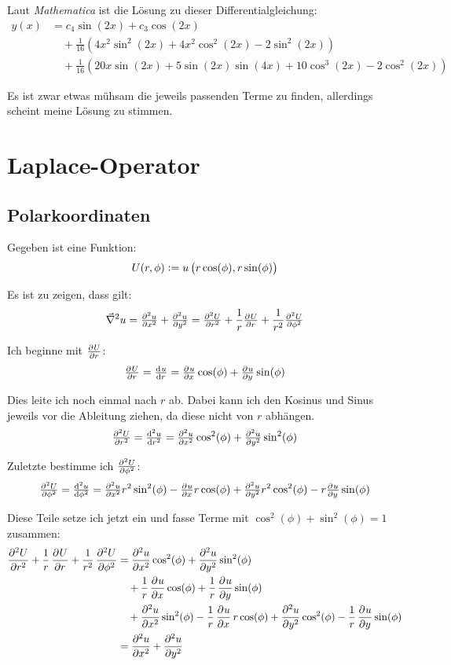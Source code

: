 \documentclass[11pt, ngerman]{article}
\newcommand{\laplace}{\vnabla^2}
\newcommand{\vnabla}{\vec \nabla}
\begin{document}
Laut \textit{Mathematica} ist die Lösung zu dieser
Differentialgleichung:
\begin{align*}
y(x) &= c_4 \sin (2 x)+c_3 \cos (2 x) \\
		 &\quad+\frac{1}{16} \left(4 x^2 \sin ^2(2 x)+4 x^2
   \cos ^2(2 x)-2 \sin ^2(2 x)\right) \\
   &\quad+\frac{1}{16} \left( 20 x \sin (2 x)+5 \sin (2 x) \sin (4 x)+10
   \cos ^3(2 x)-2 \cos ^2(2 x)\right)
\end{align*}

Es ist zwar etwas mühsam die jeweils passenden Terme zu finden, allerdings
scheint meine Lösung zu stimmen.

\section{Laplace-Operator}

\subsection{Polarkoordinaten}

Gegeben ist eine Funktion:
\[
	U(r, \phi) := u\del{r \cos(\phi), r \sin(\phi)}
\]

Es ist zu zeigen, dass gilt:
\[
	\laplace u = \pd[2] ux + \pd[2] uy = \pd[2] Ur + \frac 1r \pd Ur + \frac
	1{r^2} \pd[2] U\phi
\]

Ich beginne mit $\pd U r$:
\[
	\pd Ur = \od ur = \pd ux \cos(\phi) + \pd uy \sin(\phi)
\]

Dies leite ich noch einmal nach $r$ ab. Dabei kann ich den Kosinus und Sinus
jeweils vor die Ableitung ziehen, da diese nicht von $r$ abhängen.
\[
	\pd[2] Ur = \od[2] ur = \pd[2] ux \cos^2(\phi) + \pd[2] uy \sin^2(\phi)
\]

Zuletzte bestimme ich $\pd[2] U\phi$:
\[
	\pd[2] U\phi = \od[2] u\phi = \pd[2] ux r^2 \sin^2(\phi) - \pd ux r
	\cos(\phi) + \pd[2] uy r^2 \cos^2(\phi) - r \pd uy \sin(\phi)
\]

Diese Teile setze ich jetzt ein und fasse Terme mit $\cos^2(\phi) +
\sin^2(\phi) = 1$ zusammen:
%
\begin{align*}
	\dpd[2] Ur + \frac 1r \dpd Ur + \frac 1{r^2} \dpd[2] U\phi
	&=\dpd[2] ux \cos^2(\phi) + \dpd[2] uy \sin^2(\phi) \\
	&\quad+ \frac 1r \dpd ux \cos(\phi) + \frac 1r \dpd uy \sin(\phi) \\
	&\quad+ \dpd[2] ux \sin^2(\phi) - \frac 1r \dpd ux r \cos(\phi) + \dpd[2]
	uy \cos^2(\phi) - \frac 1r \dpd uy \sin(\phi) \\
	&= \dpd[2] ux + \dpd[2] uy
\end{align*}
\end{document}
